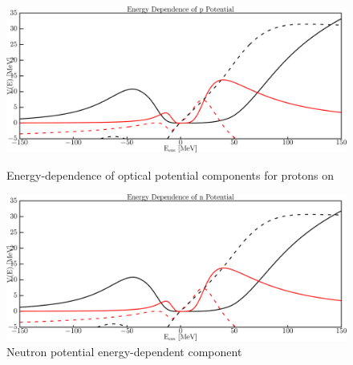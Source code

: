 \begin{figure}[H]
    \centering
    \begin{minipage}{0.45\textwidth}
        \centering
        \includegraphics[width=1.0\textwidth]{figures/o18_protonPotentials.png}
        \caption{Energy-dependence of optical potential components for protons
        on \oEight}
        \label{DOMFitData_o18_proton_potentialComponent_energy}
    \end{minipage}\hfill
    \begin{minipage}{0.45\textwidth}
        \centering
        \includegraphics[width=1.0\textwidth]{figures/o18_neutronPotentials.png}
        \caption{Neutron potential energy-dependent component}
        \label{DOMFitData_o18_neutron_potentialComponent_energy}
    \end{minipage}
\end{figure}

